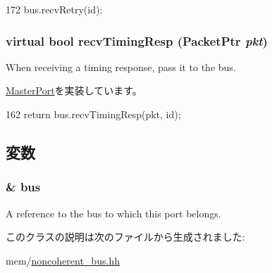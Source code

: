 \begin{DoxyCode}
172         { bus.recvRetry(id); }
\end{DoxyCode}
\hypertarget{classNoncoherentBus_1_1NoncoherentBusMasterPort_a197a199a6dabb291067a978d54bd2d04}{
\subsubsection[{recvTimingResp}]{\setlength{\rightskip}{0pt plus 5cm}virtual bool recvTimingResp ({\bf PacketPtr} {\em pkt})}}
\label{classNoncoherentBus_1_1NoncoherentBusMasterPort_a197a199a6dabb291067a978d54bd2d04}
When receiving a timing response, pass it to the bus. 

\hyperlink{classMasterPort_abd323548d6c93f8b0543f1fe3a86ca35}{MasterPort}を実装しています。


\begin{DoxyCode}
162         { return bus.recvTimingResp(pkt, id); }
\end{DoxyCode}


\subsection{変数}
\hypertarget{classNoncoherentBus_1_1NoncoherentBusMasterPort_aea8faab4afa44810e2dfac0ab026fb82}{
\subsubsection[{bus}]{\& {\bf bus}}}
\label{classNoncoherentBus_1_1NoncoherentBusMasterPort_aea8faab4afa44810e2dfac0ab026fb82}
A reference to the bus to which this port belongs. 

このクラスの説明は次のファイルから生成されました:\begin{DoxyCompactItemize}
\item 
mem/\hyperlink{noncoherent__bus_8hh}{noncoherent\_\-bus.hh}\end{DoxyCompactItemize}

